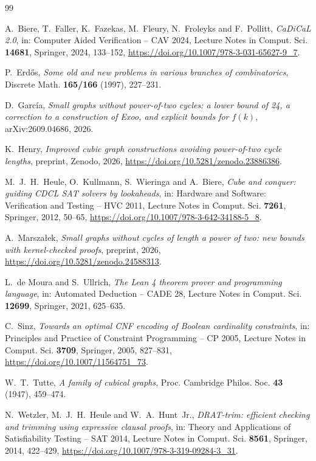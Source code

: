 \documentclass[11pt]{amsart}
\theoremstyle{remark}
\begin{document}
\begin{thebibliography}{99}

A.~Biere, T.~Faller, K.~Fazekas, M.~Fleury, N.~Froleyks and F.~Pollitt,
\emph{CaDiCaL 2.0}, in: Computer Aided Verification -- CAV 2024, Lecture Notes
in Comput. Sci. \textbf{14681}, Springer, 2024, 133--152,
\url{https://doi.org/10.1007/978-3-031-65627-9_7}.

P.~Erdős, \emph{Some old and new problems in various branches of combinatorics},
Discrete Math. \textbf{165/166} (1997), 227--231.

D.~García, \emph{Small graphs without power-of-two cycles: a lower bound of 24,
a correction to a construction of Exoo, and explicit bounds for $f(k)$},
arXiv:2609.04686, 2026.

K.~Henry, \emph{Improved cubic graph constructions avoiding power-of-two cycle
lengths}, preprint, Zenodo, 2026, \url{https://doi.org/10.5281/zenodo.23886386}.

M.~J.~H.~Heule, O.~Kullmann, S.~Wieringa and A.~Biere, \emph{Cube and conquer:
guiding CDCL SAT solvers by lookaheads}, in: Hardware and Software:
Verification and Testing -- HVC 2011, Lecture Notes in Comput. Sci.
\textbf{7261}, Springer, 2012, 50--65,
\url{https://doi.org/10.1007/978-3-642-34188-5_8}.

A.~Marszałek, \emph{Small graphs without cycles of length a power of two: new
bounds with kernel-checked proofs}, preprint, 2026,
\url{https://doi.org/10.5281/zenodo.24588313}.

L.~de Moura and S.~Ullrich, \emph{The Lean 4 theorem prover and programming
language}, in: Automated Deduction -- CADE 28, Lecture Notes in Comput. Sci.
\textbf{12699}, Springer, 2021, 625--635.

C.~Sinz, \emph{Towards an optimal CNF encoding of Boolean cardinality
constraints}, in: Principles and Practice of Constraint Programming -- CP 2005,
Lecture Notes in Comput. Sci. \textbf{3709}, Springer, 2005, 827--831,
\url{https://doi.org/10.1007/11564751_73}.

W.~T.~Tutte, \emph{A family of cubical graphs}, Proc. Cambridge Philos. Soc.
\textbf{43} (1947), 459--474.

N.~Wetzler, M.~J.~H.~Heule and W.~A.~Hunt~Jr., \emph{DRAT-trim: efficient
checking and trimming using expressive clausal proofs}, in: Theory and
Applications of Satisfiability Testing -- SAT 2014, Lecture Notes in Comput.
Sci. \textbf{8561}, Springer, 2014, 422--429,
\url{https://doi.org/10.1007/978-3-319-09284-3_31}.

\end{thebibliography}
\end{document}
